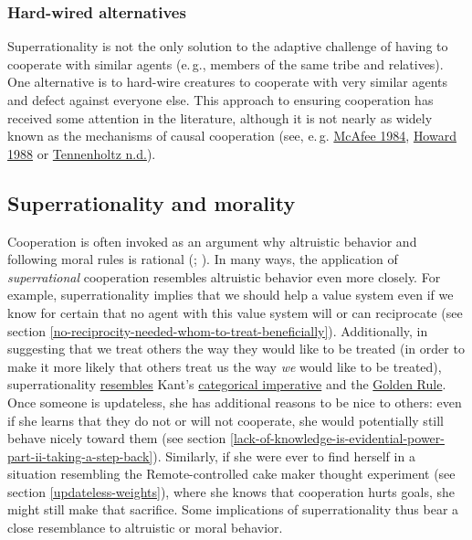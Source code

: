 \subsubsection{Hard-wired alternatives}\label{hard-wired-alternatives}

Superrationality is not the only solution to the adaptive challenge of
having to cooperate with similar agents (e.\,g., members of the same tribe
and relatives). One alternative is to hard-wire creatures to cooperate
with very similar agents and defect against everyone else. This approach
to ensuring cooperation has received some attention in the literature,
although it is not nearly as widely known as the mechanisms of causal
cooperation (see, e.\,g.
\href{http://www.mcafee.cc/Papers/PDF/EffectiveComputability.pdf}{McAfee
1984},
\href{https://sl4librarian.files.wordpress.com/2016/12/howard1988.pdf}{Howard
1988} or
\href{https://ie.technion.ac.il/~moshet/progeqnote4.pdf}{Tennenholtz
n.d.}).

\hypertarget{superrationality-and-morality}{\subsection{Superrationality
and morality}\label{superrationality-and-morality}}

Cooperation is often invoked as an argument why altruistic behavior and
following moral rules is rational
(\cite[e.\,g.,][chapter 12]{Dawkins1976-cd}; \cite{Greene2013-sq}). In many ways, the
application of \emph{superrational} cooperation resembles altruistic
behavior even more closely. For example, superrationality implies that
we should help a value system even if we know for certain that no agent
with this value system will or can reciprocate (see section
\ref{no-reciprocity-needed-whom-to-treat-beneficially}). Additionally, in
suggesting that we treat others the way they would like to be treated
(in order to make it more likely that others treat us the way \emph{we}
would like to be treated), superrationality
\href{http://briantomasik.com/interpreting-the-categorical-imperative/\#Categorical_imperative_as_decision_theory}{resembles}
Kant's
\href{https://en.wikipedia.org/wiki/Categorical_imperative}{categorical
imperative} and the
\href{https://en.wikipedia.org/wiki/Golden_Rule}{Golden Rule}.
Once someone is updateless, she has additional reasons to be nice to
others: even if she learns that they do not or will not cooperate, she
would potentially still behave nicely toward them (see section
\ref{lack-of-knowledge-is-evidential-power-part-ii-taking-a-step-back}).
Similarly, if she were ever to find herself in a situation resembling
the Remote-controlled cake maker thought experiment (see section
\ref{updateless-weights}),
where she knows that cooperation hurts goals, she might still
make that sacrifice. Some implications of superrationality thus bear a
close resemblance to altruistic or moral behavior.

